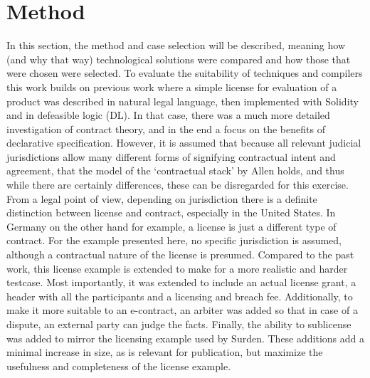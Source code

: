 \documentclass[conference]{IEEEtran}
\begin{document}
\section{Method}
In this section, the method and case selection will be described, meaning how (and why that way) technological solutions were compared and how those that were chosen were selected.
To evaluate the suitability of techniques and compilers this work builds on previous work  where a simple license for evaluation of a product was described in natural legal language, then implemented with Solidity and in defeasible logic (DL). In that case, there was a much more detailed investigation of contract theory, and in the end a focus on the benefits of declarative specification. \cite{governatoriLegalContractsImperative2018} However, it is assumed that because all relevant judicial jurisdictions allow many different forms of signifying contractual intent and agreement, that the model of the ‘contractual stack’ by Allen \cite{allenWrappedStackedSmart2018} holds, and thus while there %
are certainly differences, 
these can be disregarded for this exercise.
From a legal point of view, depending on jurisdiction there is a definite distinction between license and contract, especially in the United States. %
In Germany on the other hand for example, a license is just a different type of contract. For the example presented here, no specific jurisdiction is assumed, although a contractual nature of the license is presumed. \cite{guadamuzComparativeAnalysisCopyright2013}
Compared to the past work, this license example is extended to make for a more realistic and harder testcase. %
Most importantly, it was extended to include an actual license grant, a header with all the participants and a licensing and breach fee. Additionally, to make it more suitable to an e-contract, an arbiter was added so that in case of a dispute, an external party can judge the facts. Finally, the ability to sublicense was added to mirror the licensing example used by Surden. \cite{surdenArtificialIntelligenceLaw2019} These additions add a minimal increase in size, as is relevant for publication, but maximize the usefulness and completeness of the license example.
\end{document}
